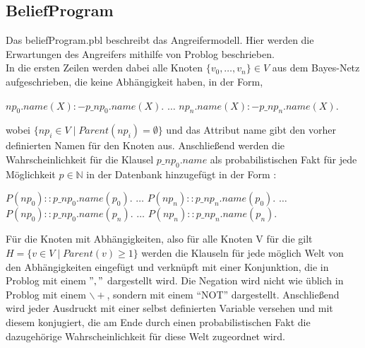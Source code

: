 \documentclass[german,version-2020-11]{uzl-thesis}
\begin{document}
\subsection{BeliefProgram}
Das beliefProgram.pbl beschreibt das Angreifermodell. Hier werden die Erwartungen des Angreifers mithilfe von Problog beschrieben. \\ 
In die ersten Zeilen werden dabei alle Knoten $\{v_0, \dots ,v_n\} \in V$ aus dem Bayes-Netz aufgeschrieben, die keine Abhängigkeit haben, in der Form,
\begin{Pseudocode}
$np_0.name(X) :- p\_np_0.name(X).$ 
$\dots$
$np_n.name(X) :- p\_np_n.name(X).$ 
\end{Pseudocode}
wobei $\{np_i \in V \mid Parent(np_i) = \emptyset\}$ und das Attribut name gibt den vorher definierten Namen für den Knoten aus. Anschließend werden die Wahrscheinlichkeit für die Klausel $p\_np_0.name$ als probabilistischen Fakt für jede Möglichkeit $p \in \mathbb{N}$ in der Datenbank hinzugefügt in der Form :
\begin{Pseudocode}
$P(np_0) ::  p\_np_0.name(p_0).$ 
$\dots$
$P(np_n) ::  p\_np_n.name(p_0).$ 
$\dots$
$P(np_0) ::  p\_np_0.name(p_n).$ 
$\dots$
$P(np_n) ::  p\_np_n.name(p_n).$ 
\end{Pseudocode}
Für die Knoten mit Abhängigkeiten, also für alle Knoten V für die gilt $H=\{v \in V \mid Parent(v) \geq 1 \}$ werden die Klauseln für jede möglich Welt von den Abhängigkeiten eingefügt und verknüpft mit einer Konjunktion, die in Problog mit einem $","$ dargestellt wird. Die Negation wird nicht wie üblich in Problog mit einem $\backslash +$, sondern mit einem \enquote{NOT} dargestellt. Anschließend wird jeder Ausdruckt mit einer selbst definierten Variable versehen und mit diesem konjugiert, die am Ende durch einen probabilistischen Fakt die dazugehörige Wahrscheinlichkeit für diese Welt zugeordnet wird.\\
\end{document}
